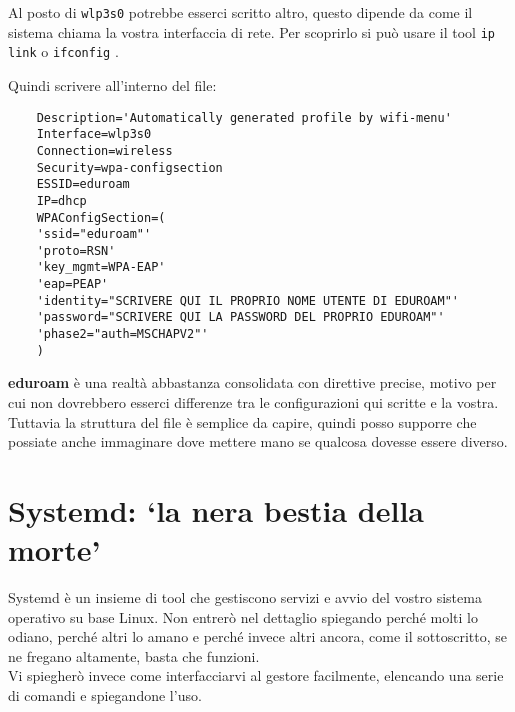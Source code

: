 \documentclass[twoside,italian]{book}
\newcommand{\code}[1]{
	\texttt{\textcolor{code}{#1}}
}
\begin{document}
			\begin{tcolorbox}[floatplacement=b,width=\textwidth,colback={blue},title={NOTA BENE:},colbacktitle=gray,coltitle=white,colupper=white]
				Al posto di \code{wlp3s0} potrebbe esserci scritto altro, questo dipende da come il sistema chiama la vostra interfaccia di rete. Per scoprirlo si può usare il tool \code{ip link} o \code{ifconfig}.
			\end{tcolorbox}
			
			Quindi scrivere all'interno del file:
\begin{lstlisting}
	Description='Automatically generated profile by wifi-menu'
	Interface=wlp3s0
	Connection=wireless
	Security=wpa-configsection
	ESSID=eduroam
	IP=dhcp
	WPAConfigSection=(
	'ssid="eduroam"'
	'proto=RSN'
	'key_mgmt=WPA-EAP'
	'eap=PEAP'
	'identity="SCRIVERE QUI IL PROPRIO NOME UTENTE DI EDUROAM"'
	'password="SCRIVERE QUI LA PASSWORD DEL PROPRIO EDUROAM"'
	'phase2="auth=MSCHAPV2"'
	)
\end{lstlisting}
			
			\textbf{eduroam} è una realtà abbastanza consolidata con direttive precise, motivo per cui non dovrebbero esserci differenze tra le configurazioni qui scritte e la vostra. Tuttavia la struttura del file è semplice da capire, quindi posso supporre che possiate anche immaginare dove mettere mano se qualcosa dovesse essere diverso.
			
		
		\section{Systemd: `la nera bestia della morte'}
			
			Systemd è un insieme di tool che gestiscono servizi e avvio del vostro sistema operativo su base Linux. Non entrerò nel dettaglio spiegando perché molti lo odiano, perché altri lo amano e perché invece altri ancora, come il sottoscritto, se ne fregano altamente, basta che funzioni.\\
			
			Vi spiegherò invece come interfacciarvi al gestore facilmente, elencando una serie di comandi e spiegandone l'uso.
			
\end{document}

